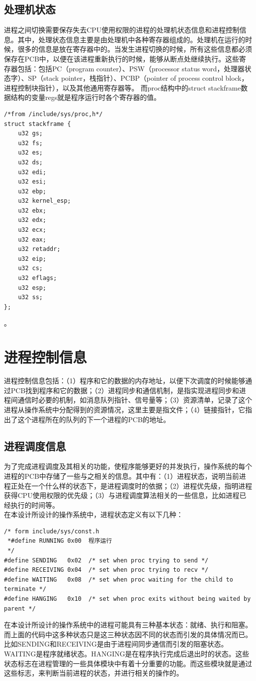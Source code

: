 \documentclass[UTF8,nofonts,cs4size]{ctexrep}
\begin{document}
\subsection{处理机状态}
进程之间切换需要保存失去CPU使用权限的进程的处理机状态信息和进程控制信息。其中，处理状态信息主要是由处理机中各种寄存器组成的。处理机在运行的时候，很多的信息是放在寄存器中的。当发生进程切换的时候，所有这些信息都必须保存在PCB中，以便在该进程重新执行的时候，能够从断点处继续执行。这些寄存器包括：包括PC（program counter）、PSW（processor status word，处理器状态字）、SP（stack pointer，栈指针）、PCBP（pointer of process control block，进程控制块指针），以及其他通用寄存器等。
而proc结构中的struct stackframe数据结构的变量regs就是程序运行时各个寄存器的值。
\begin{lstlisting}
/*from /include/sys/proc,h*/
struct stackframe {	
	u32	gs;		
	u32	fs;		
	u32	es;		
	u32	ds;		
	u32	edi;		
	u32	esi;		
	u32	ebp;		
	u32	kernel_esp;	
	u32	ebx;			
	u32	edx;		
	u32	ecx;		
	u32	eax;		
	u32	retaddr;	
	u32	eip;		
	u32	cs;		
	u32	eflags;		
	u32	esp;		
	u32	ss;		
};
\end{lstlisting}。
\section{进程控制信息}
进程控制信息包括：（1）程序和它的数据的内存地址，以便下次调度的时候能够通过PCB找到程序和它的数据；（2）进程同步和通信机制，是指实现进程同步和进程间通信时必要的机制，如消息队列指针、信号量等；（3）资源清单，记录了这个进程从操作系统中分配得到的资源情况，这里主要是指文件；（4）链接指针，它指出了这个进程所在的队列的下一个进程的PCB的地址。
\subsection{进程调度信息}
为了完成进程调度及其相关的功能，使程序能够更好的并发执行，操作系统的每个进程的PCB中存储了一些与之相关的信息。其中有：（1）进程状态，说明当前进程正处在一个什么样的状态下，是进程调度时的依据；（2）进程优先级，指明进程获得CPU使用权限的优先级；（3）与进程调度算法相关的一些信息，比如进程已经执行的时间等。
\\
\indent  
在本设计所设计的操作系统中，进程状态定义有以下几种：
\begin{lstlisting}
/* form include/sys/const.h
 *#define RUNNING 0x00  程序运行
 */
#define SENDING   0x02	/* set when proc trying to send */
#define RECEIVING 0x04	/* set when proc trying to recv */
#define WAITING   0x08	/* set when proc waiting for the child to terminate */
#define HANGING   0x10	/* set when proc exits without being waited by parent */
\end{lstlisting}
在本设计所设计的操作系统中的进程可能具有三种基本状态：就绪、执行和阻塞。而上面的代码中这多种状态只是这三种状态因不同的状态而引发的具体情况而已。比如SENDING和RECEIVING是由于进程间同步通信而引发的阻塞状态。WAITING是程序就绪状态。HANGING是在程序执行完成后退出时的状态。这些状态标志在进程管理的一些具体模块中有着十分重要的功能。而这些模块就是通过这些标志，来判断当前进程的状态，并进行相关的操作的。
\end{document}
